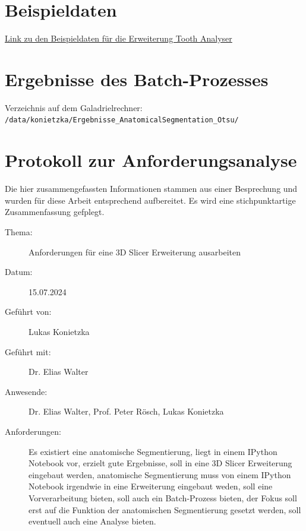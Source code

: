 \section{Beispieldaten}
\href{https://github.com/lukaskonietzka/ToothAnalyserSampleData/releases/tag/v1.0.0}{Link
zu den Beispieldaten für die Erweiterung Tooth Analyser}

\section{Ergebnisse des Batch-Prozesses}
Verzeichnis auf dem Galadrielrechner:\\ \texttt{/data/konietzka/Ergebnisse\_AnatomicalSegmentation\_Otsu/}

\section{Protokoll zur Anforderungsanalyse}
Die hier zusammengefassten Informationen stammen aus einer Besprechung und
wurden für diese Arbeit entsprechend aufbereitet. Es wird eine stichpunktartige Zusammenfassung
gefplegt.

\begin{description}
	\item[Thema:] Anforderungen für eine 3D Slicer Erweiterung ausarbeiten

	\item[Datum:] 15.07.2024

	\item[Geführt von:] Lukas Konietzka

	\item[Geführt mit:] Dr. Elias Walter 

	\item[Anwesende:] Dr. Elias Walter, Prof. Peter Rösch, Lukas Konietzka

	\item[Anforderungen:] Es existiert eine anatomische Segmentierung, liegt in
		einem IPython Notebook vor, erzielt gute Ergebnisse, soll in eine 3D Slicer
		Erweiterung eingebaut werden, anatomische Segmentierung muss von einem IPython
		Notebook irgendwie in eine Erweiterung eingebaut weden, soll eine
		Vorverarbeitung bieten, soll auch ein Batch-Prozess bieten, der Fokus soll
		erst auf die Funktion der anatomischen Segmentierung gesetzt werden, soll eventuell
		auch eine Analyse bieten.
\end{description}
